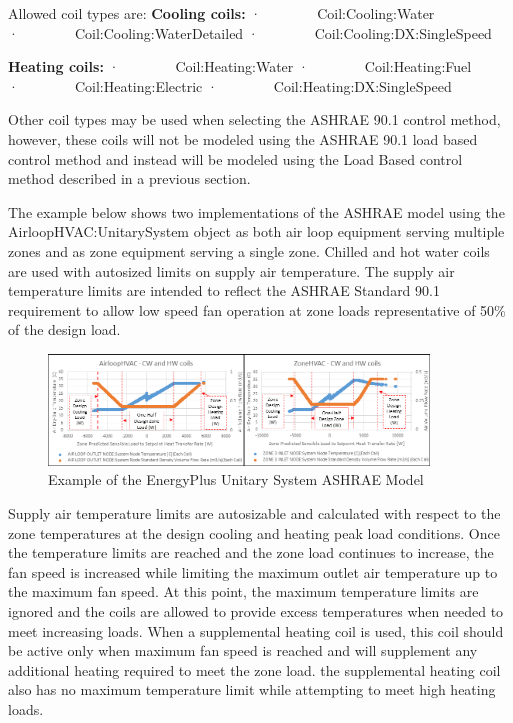 Allowed coil types are:
\textbf{Cooling coils:}
·~~~~~~~~Coil:Cooling:Water
·~~~~~~~~Coil:Cooling:WaterDetailed
·~~~~~~~~Coil:Cooling:DX:SingleSpeed

\textbf{Heating coils:}
·~~~~~~~~Coil:Heating:Water
·~~~~~~~~Coil:Heating:Fuel
·~~~~~~~~Coil:Heating:Electric
·~~~~~~~~Coil:Heating:DX:SingleSpeed

Other coil types may be used when selecting the ASHRAE 90.1 control method, however, these coils will not be modeled using the ASHRAE 90.1 load based control method and instead will be modeled using the Load Based control method described in a previous section.

The example below shows two implementations of the ASHRAE model using the AirloopHVAC:UnitarySystem object as both air loop equipment serving multiple zones and as zone equipment serving a single zone. Chilled and hot water coils are used with autosized limits on supply air temperature. The supply air temperature limits are intended to reflect the ASHRAE Standard 90.1 requirement to allow low speed fan operation at zone loads representative of 50\% of the design load.

\begin{figure}[hbtp]
\centering
\includegraphics[width=0.9\textwidth, height=0.9\textheight, keepaspectratio=true]{media/UnitarySystem_SZVAV_watercoils.png}
\caption{Example of the EnergyPlus Unitary System ASHRAE Model \protect \label{fig:example-of-the-energyplus-unitary-system-ashrae-model}}
\end{figure}

Supply air temperature limits are autosizable and calculated with respect to the zone temperatures at the design cooling and heating peak load conditions. Once the temperature limits are reached and the zone load continues to increase, the fan speed is increased while limiting the maximum outlet air temperature up to the maximum fan speed. At this point, the maximum temperature limits are ignored and the coils are allowed to provide excess temperatures when needed to meet increasing loads. When a supplemental heating coil is used, this coil should be active only when maximum fan speed is reached and will supplement any additional heating required to meet the zone load. the supplemental heating coil also has no maximum temperature limit while attempting to meet high heating loads.

